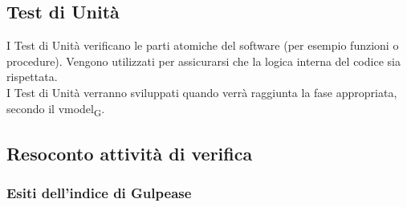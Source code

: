 \subsection{Test di Unità}
I Test di Unità verificano le parti atomiche del software (per esempio funzioni o procedure). Vengono utilizzati per assicurarsi che la logica interna del codice sia rispettata.\\I Test di Unità verranno sviluppati quando verrà raggiunta la fase appropriata, secondo il \gls{vmodel}\textsubscript{G}.

\subsection{Resoconto attività di verifica}
\subsubsection{Esiti dell'indice di Gulpease}
